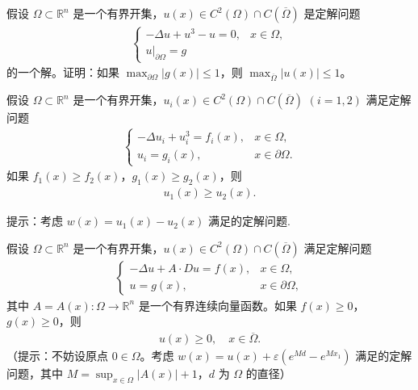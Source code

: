 \documentclass[../../main.tex]{subfiles}%
\begin{document}
\begin{example}
假设 $\Omega\subset\mathbb{R}^n$ 是一个有界开集，$u(x)\in C^2(\Omega)\cap C(\overline{\Omega})$ 是定解问题
\begin{align*}
\begin{cases}
-\Delta u + u^3 - u = 0, & x\in\Omega, \\
u|_{\partial\Omega} = g
\end{cases}
\end{align*}
的一个解。证明：如果 $\max_{\partial\Omega}|g(x)|\leqslant 1$，则 $\max_{\overline{\Omega}}|u(x)|\leqslant 1$。
\end{example}

\begin{example}
假设 $\Omega\subset\mathbb{R}^n$ 是一个有界开集，$u_i(x)\in C^2(\Omega)\cap C(\overline{\Omega})$ $(i=1,2)$ 满足定解问题
\begin{align*}
\begin{cases}
-\Delta u_i + u_i^3 = f_i(x), & x\in\Omega, \\
u_i = g_i(x), & x\in\partial\Omega.
\end{cases}
\end{align*}
如果 $f_1(x)\geqslant f_2(x)$，$g_1(x)\geqslant g_2(x)$，则
\begin{align*}
u_1(x)\geqslant u_2(x).
\end{align*}
\end{example}
\begin{note}
提示：考虑 $w(x)=u_1(x)-u_2(x)$ 满足的定解问题.
\end{note}

\begin{example}
假设 $\Omega\subset\mathbb{R}^n$ 是一个有界开集，$u(x)\in C^2(\Omega)\cap C(\overline{\Omega})$ 满足定解问题
\begin{align*}
\begin{cases}
-\Delta u + A\cdot Du = f(x), & x\in\Omega, \\
u = g(x), & x\in\partial\Omega,
\end{cases}
\end{align*}
其中 $A=A(x):\Omega\to\mathbb{R}^n$ 是一个有界连续向量函数。如果 $f(x)\geqslant 0$，$g(x)\geqslant 0$，则
\begin{align*}
u(x)\geqslant 0,\quad x\in\overline{\Omega}.
\end{align*}
（提示：不妨设原点 $0\in\Omega$。考虑 $w(x)=u(x)+\varepsilon(e^{Md}-e^{Mx_1})$ 满足的定解问题，其中 $M=\sup_{x\in\Omega}|A(x)|+1$，$d$ 为 $\Omega$ 的直径）
\end{example}
\end{document}
